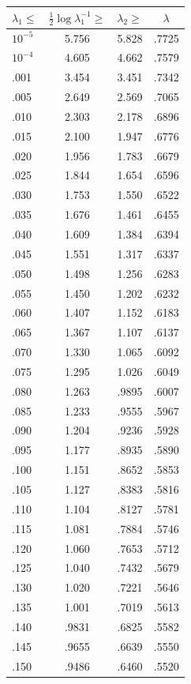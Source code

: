 \documentclass[12pt,psamsfonts]{amsart}
\theoremstyle{definition}
\theoremstyle{remark}
\numberwithin{equation}{section}
\begin{document}
\begin{table}
\begin{tabular}{l|c|c|c} 
$\lambda_1 \leq$ & $\tfrac{1}{2}\log \lambda_1^{-1} \geq$ & $\lambda_2 \geq$ & $\lambda$ \\
 \hline 
 $10^{-5}$ &  5.756 &  5.828 &  .7725 \\ 
 $10^{-4}$ &  4.605 &  4.662 &  .7579 \\ 
 .001 &  3.454 &  3.451 &  .7342 \\ 
 .005 &  2.649 &  2.569 &  .7065 \\ 
 .010 &  2.303 &  2.178 &  .6896 \\ 
 .015 &  2.100 &  1.947 &  .6776 \\ 
 .020 &  1.956 &  1.783 &  .6679 \\ 
 .025 &  1.844 &  1.654 &  .6596 \\ 
 .030 &  1.753 &  1.550 &  .6522 \\ 
 .035 &  1.676 &  1.461 &  .6455 \\ 
 .040 &  1.609 &  1.384 &  .6394 \\ 
 .045 &  1.551 &  1.317 &  .6337 \\ 
 .050 &  1.498 &  1.256 &  .6283 \\ 
 .055 &  1.450 &  1.202 &  .6232 \\ 
 .060 &  1.407 &  1.152 &  .6183 \\ 
 .065 &  1.367 &  1.107 &  .6137 \\ 
 .070 &  1.330 &  1.065 &  .6092 \\ 
 .075 &  1.295 &  1.026 &  .6049 \\ 
 .080 &  1.263 &  .9895 &  .6007 \\ 
 .085 &  1.233 &  .9555 &  .5967 \\ 
 .090 &  1.204 &  .9236 &  .5928 \\ 
 .095 &  1.177 &  .8935 &  .5890 \\ 
 .100 &  1.151 &  .8652 &  .5853 \\ 
 .105 &  1.127 &  .8383 &  .5816 \\ 
 .110 &  1.104 &  .8127 &  .5781 \\ 
 .115 &  1.081 &  .7884 &  .5746 \\ 
 .120 &  1.060 &  .7653 &  .5712 \\ 
 .125 &  1.040 &  .7432 &  .5679 \\ 
 .130 &  1.020 &  .7221 &  .5646 \\ 
 .135 &  1.001 &  .7019 &  .5613 \\ 
 .140 &  .9831 &  .6825 &  .5582 \\ 
 .145 &  .9655 &  .6639 &  .5550 \\ 
 .150 &  .9486 &  .6460 &  .5520 \\


\end{tabular}
\end{table}
\end{document}
